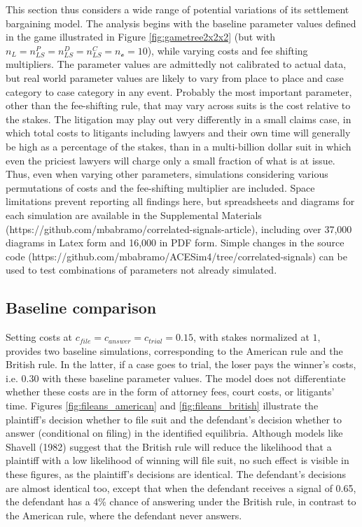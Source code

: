 \documentclass{article}
\begin{document}
This section thus considers a wide range of potential variations of its settlement bargaining model. The analysis begins with the baseline parameter values defined in the game illustrated in Figure \ref{fig:gametree2x2x2} (but with $n_{L}=n_{LS}^P=n_{LS}^D=n_{LS}^C=n_{\mathcal{o}}=10$), while varying costs and fee shifting multipliers. The parameter values are admittedly not calibrated to actual data, but real world parameter values are likely to vary from place to place and case category to case category in any event. Probably the most important parameter, other than the fee-shifting rule, that may vary across suits is the cost relative to the stakes. The litigation may play out very differently in a small claims case, in which total costs to litigants including lawyers and their own time will generally be high as a percentage of the stakes, than in a multi-billion dollar suit in which even the priciest lawyers will charge only a small fraction of what is at issue. Thus, even when varying other parameters, simulations considering various permutations of costs and the fee-shifting multiplier are included. Space limitations prevent reporting all findings here, but spreadsheets and diagrams for each simulation are available in the Supplemental Materials (https://github.com/mbabramo/correlated-signals-article), including over 37,000 diagrams in Latex form and 16,000 in PDF form. Simple changes in the source code (https://github.com/mbabramo/ACESim4/tree/correlated-signals) can be used to test combinations of parameters not already simulated.

\subsection{Baseline comparison} \label{baseline}

Setting costs at $c_{file} = c_{answer} = c_{trial} = 0.15$, with stakes normalized at $1$, provides two baseline simulations, corresponding to the American rule and the British rule. In the latter, if a case goes to trial, the loser pays the winner's costs, i.e. $0.30$ with these baseline parameter values. The model does not differentiate whether these costs are in the form of attorney fees, court costs, or litigants' time. Figures \ref{fig:fileans_american} and \ref{fig:fileans_british} illustrate the plaintiff's decision whether to file suit and the defendant's decision whether to answer (conditional on filing) in the identified equilibria. Although models like Shavell (1982) \cite{shavell} suggest that the British rule will reduce the likelihood that a plaintiff with a low likelihood of winning will file suit, no such effect is visible in these figures, as the plaintiff's decisions are identical. The defendant's decisions are almost identical too, except that when the defendant receives a signal of 0.65, the defendant has a 4\% chance of answering under the British rule, in contrast to the American rule, where the defendant never answers. 
\end{document}
